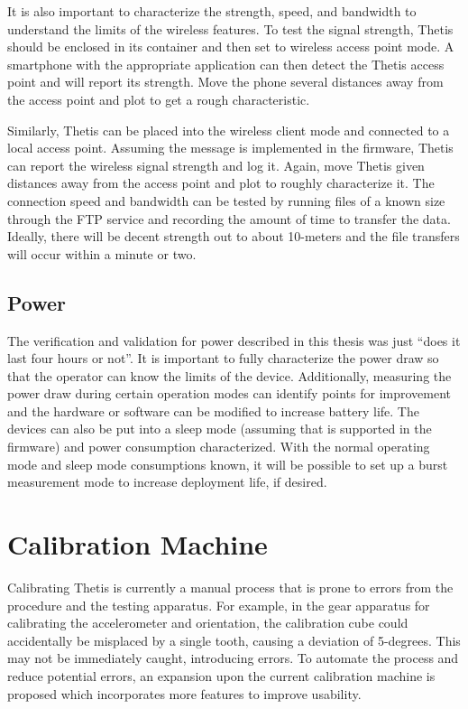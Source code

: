 It is also important to characterize the strength, speed, and bandwidth to understand the limits of the wireless features.
To test the signal strength, Thetis should be enclosed in its container and then set to wireless access point mode.
A smartphone with the appropriate application can then detect the Thetis access point and will report its strength.
Move the phone several distances away from the access point and plot to get a rough characteristic.

Similarly, Thetis can be placed into the wireless client mode and connected to a local access point.
Assuming the message is implemented in the firmware, Thetis can report the wireless signal strength and log it.
Again, move Thetis given distances away from the access point and plot to roughly characterize it.
The connection speed and bandwidth can be tested by running files of a known size through the FTP service and recording the amount of time to transfer the data.
Ideally, there will be decent strength out to about 10-meters and the file transfers will occur within a minute or two.

\subsection{Power}
The verification and validation for power described in this thesis was just ``does it last four hours or not''.
It is important to fully characterize the power draw so that the operator can know the limits of the device.
Additionally, measuring the power draw during certain operation modes can identify points for improvement and the hardware or software can be modified to increase battery life.
The devices can also be put into a sleep mode (assuming that is supported in the firmware) and power consumption characterized.
With the normal operating mode and sleep mode consumptions known, it will be possible to set up a burst measurement mode to increase deployment life, if desired.

\section{Calibration Machine}
Calibrating Thetis is currently a manual process that is prone to errors from the procedure and the testing apparatus.
For example, in the gear apparatus for calibrating the accelerometer and orientation, the calibration cube could accidentally be misplaced by a single tooth, causing a deviation of 5-degrees.
This may not be immediately caught, introducing errors.
To automate the process and reduce potential errors, an expansion upon the current calibration machine is proposed which incorporates more features to improve usability.

